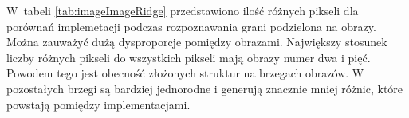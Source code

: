 W~tabeli \ref{tab:imageImageRidge} przedstawiono ilość różnych pikseli dla porównań implemetacji podczas rozpoznawania grani podzielona na obrazy. Można zauważyć dużą dysproporcje pomiędzy obrazami. Największy stosunek liczby różnych pikseli do wszystkich pikseli mają obrazy numer dwa i pięć. Powodem tego jest obecność złożonych struktur na brzegach obrazów. W pozostałych brzegi są bardziej jednorodne i generują znacznie mniej różnic, które powstają pomiędzy implementacjami.

